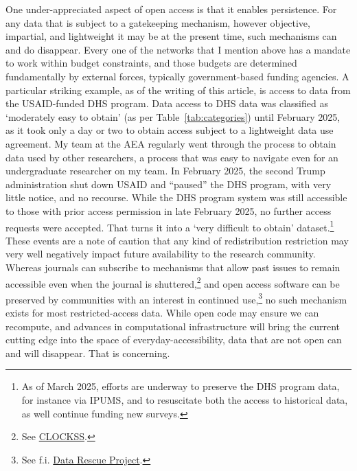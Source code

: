 \documentclass{Revue-economique}
\begin{document}
\begin{Article} [%
	Titre={Reproducibility and Open Science in Economics},
	Auteur={Lars Vilhuber\thanks{Cornell University, lars.vilhuber@cornell.edu}}]
\begin{refsection}[Main]
One under-appreciated aspect of open access is that it enables persistence. 
For any data that is subject to a gatekeeping mechanism, however objective, impartial, and lightweight it may be at the present time, such mechanisms can and do disappear. Every one of the networks that I mention above has a mandate to work within budget constraints, and those budgets are determined fundamentally by external forces, typically government-based funding agencies. A particular striking example, as of the writing of this article, is access to data from the USAID-funded \ac{DHS} program. Data access to DHS data was classified as `moderately easy to obtain' (as per Table~\ref{tab:categories}) until February 2025, as it took only a day or two to obtain access subject to a lightweight data use agreement. My team at the AEA regularly went through the process to obtain data used by other researchers, a process that was easy to navigate even for an undergraduate researcher on my team. In February 2025, the second Trump administration shut down USAID and ``paused'' the DHS program, with very little notice, and no recourse. While the DHS program system was still accessible to those with prior access permission in late February 2025, no further access requests were accepted. That turns it into a `very difficult to obtain' dataset.\footnote{As of March 2025, efforts are underway to preserve the DHS program data, for instance via IPUMS, and to resuscitate both the access to historical data, as well continue funding new surveys.} These events are a note of caution that any kind of redistribution restriction may very well negatively impact future availability to the research community. Whereas journals can subscribe to mechanisms that allow past issues to remain accessible even when the journal is shuttered,\footnote{See \href{https://clockss.org/about/how-clockss-works/}{CLOCKSS}.} and open access software can be preserved by communities with an interest in continued use,\footnote{See f.i. \href{https://www.datarescueproject.org/}{Data Rescue Project}.} no such mechanism exists for most restricted-access data. While open code may ensure we can recompute, and advances in computational infrastructure will bring the current cutting edge into the space of everyday-accessibility, data that are not open can and will disappear. That is concerning.



\begin{appendices}




\end{appendices}
\end{refsection}
\end{Article}
\end{document}
